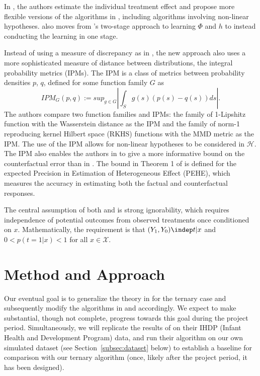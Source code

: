 \documentclass{article}
\begin{document}
In \cite{shalit2017estimating}, the authors estimate the individual treatment effect and propose more flexible versions of the algorithms in \cite{johansson2016learning}, including algorithms involving non-linear hypotheses. 
\cite{shalit2017estimating} also moves from \cite{johansson2016learning}'s two-stage approach to learning $\Phi$ and $h$ to instead conducting the learning in one stage.

Instead of using a measure of discrepancy as in \cite{johansson2016learning}, the new approach also uses a more sophisticated measure of distance between distributions, the integral probability metrics (IPMs). The IPM is a class of metrics between probability densities $p$, $q$, defined for some function family $G$ as
\begin{equation}
    IPM_G(p,q) := sup_{g \in G} \left| \int_S g(s)(p(s)-q(s))ds\right|.
\end{equation}
The authors compare two function families and IPMs: the family of 1-Lipshitz function with the Wasserstein distance as the IPM and the family of norm-1 reproducing kernel Hilbert space (RKHS) functions with the MMD metric as the IPM. The use of the IPM allows for non-linear hypotheses to be considered in $\mathcal{H}$. The IPM also enables the authors in \cite{shalit2017estimating} to give a more informative bound on the counterfactual error than in \cite{johansson2016learning}. The bound in Theorem 1 of \cite{shalit2017estimating} is defined for the expected Precision in Estimation of Heterogeneous Effect (PEHE), which measures the accuracy in estimating both the factual and counterfactual responses. 

The central assumption of both \cite{johansson2016learning} and \cite{shalit2017estimating} is strong ignorability, which requires independence of potential outcomes from observed treatments once conditioned on $x$.
Mathematically, the requirement is that $(Y_1, Y_0) \indep t|x$ and $0< p(t=1|x) <1$ for all $x \in \mathcal{X}$.

\section{Method and Approach}

Our eventual goal is to generalize the theory in \cite{shalit2017estimating} for the ternary case and subsequently modify the algorithms in \cite{johansson2016learning} and \cite{shalit2017estimating} accordingly. 
We expect to make substantial, though not complete, progress towards this goal during the project period.
Simultaneously, we will replicate the results of \cite{shalit2017estimating} on their IHDP (Infant Health and Development Program) data, and run their algorithm on our own simulated dataset (see Section~\ref{subsec:dataset} below) to establish a baseline for comparison with our ternary algorithm (once, likely after the project period, it has been designed).
\end{document}
